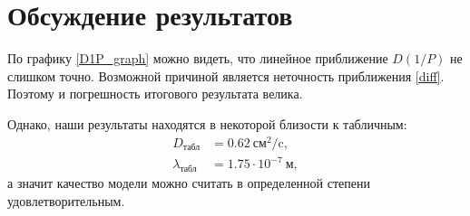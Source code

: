 \documentclass[12pt]{article}
\begin{document}
\section{Обсуждение результатов}
По графику \ref{D1P_graph} можно видеть, что линейное приближение $D(1/P)$ не слишком точно.
Возможной причиной является неточность приближения \ref{diff}. Поэтому и погрешность итогового
результата велика.

Однако, наши результаты находятся в некоторой близости к табличным:
\begin{align*}
    D_{\text{табл}} & = 0.62\ \text{см}^2/\text{c},\\
    \lambda_{\text{табл}} & = 1.75\cdot 10^{-7}\ \text{м},
\end{align*}
а значит качество модели можно считать в определенной степени удовлетворительным.
\end{document}

